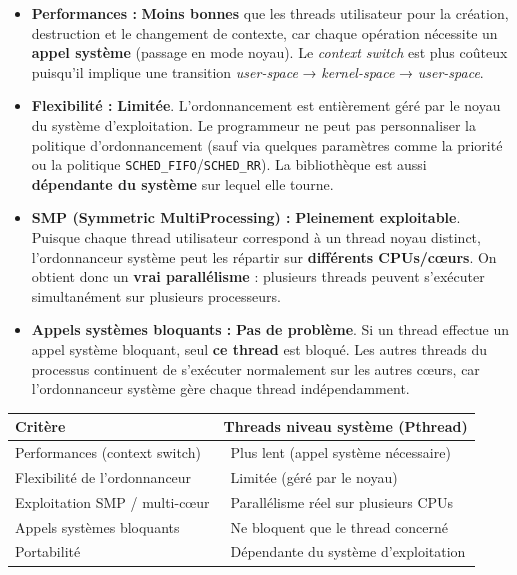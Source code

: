 \documentclass[11pt,a4paper]{article}
\newcommand{\cmark}{\ding{51}}
\newcommand{\xmark}{\ding{55}}
\let\oldtexttt\texttt
\renewcommand{\texttt}[1]{\oldtexttt{\color{keyword}#1}}
\begin{document}
\begin{itemize}
  \item \textbf{Performances :} \textbf{Moins bonnes} que les threads utilisateur pour la création, destruction et le changement de contexte, car chaque opération nécessite un \textbf{appel système} (passage en mode noyau). Le \emph{context switch} est plus coûteux puisqu'il implique une transition \emph{user-space} → \emph{kernel-space} → \emph{user-space}.

  \item \textbf{Flexibilité :} \textbf{Limitée}. L'ordonnancement est entièrement géré par le noyau du système d'exploitation. Le programmeur ne peut pas personnaliser la politique d'ordonnancement (sauf via quelques paramètres comme la priorité ou la politique \texttt{SCHED\_FIFO}/\texttt{SCHED\_RR}). La bibliothèque est aussi \textbf{dépendante du système} sur lequel elle tourne.

  \item \textbf{SMP (Symmetric MultiProcessing) :} \textbf{Pleinement exploitable}. Puisque chaque thread utilisateur correspond à un thread noyau distinct, l'ordonnanceur système peut les répartir sur \textbf{différents CPUs/cœurs}. On obtient donc un \textbf{vrai parallélisme} : plusieurs threads peuvent s'exécuter simultanément sur plusieurs processeurs.

  \item \textbf{Appels systèmes bloquants :} \textbf{Pas de problème}. Si un thread effectue un appel système bloquant, seul \textbf{ce thread} est bloqué. Les autres threads du processus continuent de s'exécuter normalement sur les autres cœurs, car l'ordonnanceur système gère chaque thread indépendamment.
\end{itemize}

\begin{center}
\begin{tabular}{|l|l|}
\hline
\textbf{Critère} & \textbf{Threads niveau système (Pthread)} \\
\hline
Performances (context switch) & \xmark\ Plus lent (appel système nécessaire) \\
\hline
Flexibilité de l'ordonnanceur & \xmark\ Limitée (géré par le noyau) \\
\hline
Exploitation SMP / multi-cœur & \cmark\ Parallélisme réel sur plusieurs CPUs \\
\hline
Appels systèmes bloquants & \cmark\ Ne bloquent que le thread concerné \\
\hline
Portabilité & \xmark\ Dépendante du système d'exploitation \\
\hline
\end{tabular}
\end{center}
\end{document}
